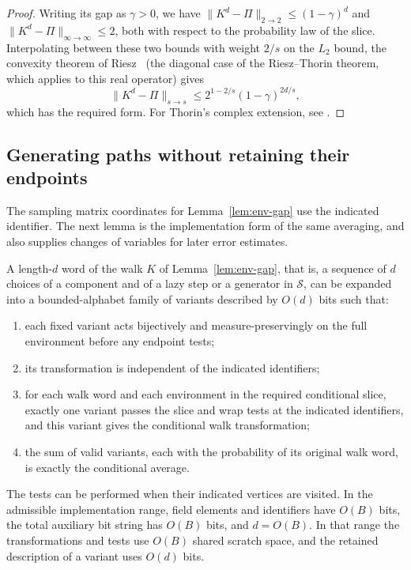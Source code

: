 \begin{proof}
Writing its gap as $\gamma>0$, we have
$\|K^d-\Pi\|_{2\to2}\le(1-\gamma)^d$ and
$\|K^d-\Pi\|_{\infty\to\infty}\le2$, both with respect to the probability
law of the slice.  Interpolating between these two bounds with weight
$2/s$ on the $L_2$ bound, the convexity theorem of
Riesz~\cite[Theorems~II and~II$'$, p.~472]{Riesz1927} (the diagonal case of
the Riesz--Thorin theorem, which applies to this real operator) gives
\[
\|K^d-\Pi\|_{s\to s}
\le 2^{1-2/s}(1-\gamma)^{2d/s},
\]
which has the required form.
For Thorin's complex extension, see
\cite[Introduction, \S0.1; Russian translation, pp.~43--45]{Thorin1948}.
\end{proof}

\subsection{Generating paths without retaining their endpoints}

The sampling matrix coordinates for Lemma~\ref{lem:env-gap} use the indicated
identifier.  The next lemma is the implementation form of the same
averaging, and also supplies changes of variables for later error estimates.

\begin{lemma}\label{lem:env-variants}
A length-$d$ word of the walk $K$ of Lemma~\ref{lem:env-gap}, that is, a
sequence of $d$ choices of a component and of a lazy step or a generator
in $\mathcal S$, can be expanded
into a bounded-alphabet family of variants described by $O(d)$ bits
such that:
\begin{enumerate}
\item each fixed variant acts bijectively and measure-preservingly on
the full environment before any endpoint tests;
\item its transformation is independent of the indicated identifiers;
\item for each walk word and each environment in the required
conditional slice, exactly one variant passes the slice and wrap
tests at the indicated identifiers, and this variant gives the
conditional walk transformation;
\item the sum of valid variants, each with the probability of its
original walk word, is exactly the conditional average.
\end{enumerate}
The tests can be performed when their indicated vertices are visited.
In the admissible implementation range, field elements and identifiers
have $O(B)$ bits, the total auxiliary bit string has $O(B)$ bits, and $d=O(B)$.
In that range the transformations and tests use $O(B)$ shared scratch space, and
the retained description of a variant uses $O(d)$ bits.
\end{lemma}


